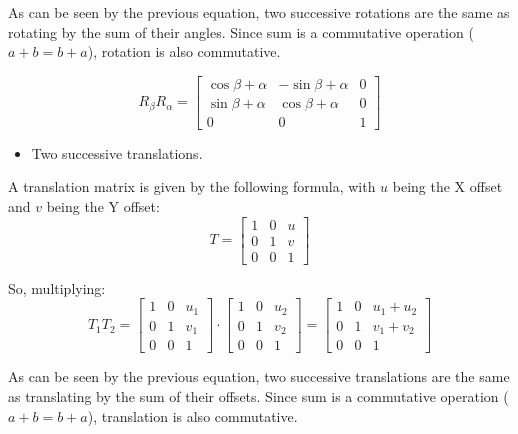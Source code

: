 \documentclass[12pt]{article}
\begin{document}
As can be seen by the previous equation, two successive rotations are the same as rotating by the sum of their angles. Since sum is a commutative operation ($a+b = b+a$), rotation is also commutative.

\begin{equation*}
    R_\beta R_\alpha= 
    \begin{bmatrix}
    \cos{\beta+\alpha} & -\sin{\beta+\alpha} & 0 \\
    \sin{\beta+\alpha} & \cos{\beta+\alpha} & 0 \\
    0 & 0 & 1
    \end{bmatrix}
\end{equation*}

\begin{itemize}
    \item Two successive translations.
\end{itemize}

A translation matrix is given by the following formula, with $u$ being the X offset and $v$ being the Y offset:
\begin{equation*}
    T = 
    \begin{bmatrix}
    1 & 0 & u \\
    0 & 1 & v \\
    0 & 0 & 1
    \end{bmatrix}
\end{equation*}

So, multiplying:
\begin{equation*}
    T_1T_2 = 
    \begin{bmatrix}
    1 & 0 & u_1 \\
    0 & 1 & v_1 \\
    0 & 0 & 1
    \end{bmatrix}
    \cdot
    \begin{bmatrix}
    1 & 0 & u_2 \\
    0 & 1 & v_2 \\
    0 & 0 & 1
    \end{bmatrix}
    =
    \begin{bmatrix}
    1 & 0 & u_1 + u_2 \\
    0 & 1 & v_1 + v_2 \\
    0 & 0 & 1
    \end{bmatrix}
\end{equation*}

As can be seen by the previous equation, two successive translations are the same as translating by the sum of their offsets. Since sum is a commutative operation ($a+b = b+a$), translation is also commutative.
\end{document}
